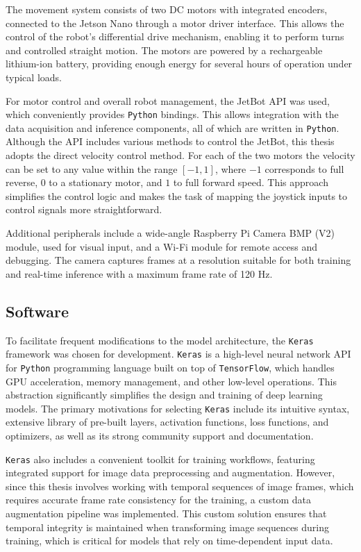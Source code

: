 The movement system consists of two DC motors with integrated encoders, connected to the Jetson Nano through a motor driver interface. This allows the control of the robot’s differential drive mechanism, enabling it to perform turns and controlled straight motion. The motors are powered by a rechargeable lithium-ion battery, providing enough energy for several hours of operation under typical loads.

For motor control and overall robot management, the JetBot API was used, which conveniently provides \texttt{Python} bindings. This allows integration with the data acquisition and inference components, all of which are written in \texttt{Python}. Although the API includes various methods to control the JetBot, this thesis adopts the direct velocity control method. For each of the two motors the velocity can be set to any value within the range \([-1, 1]\), where \(-1\) corresponds to full reverse, \(0\) to a stationary motor, and \(1\) to full forward speed. This approach simplifies the control logic and makes the task of mapping the joystick inputs to control signals more straightforward.

Additional peripherals include a wide-angle Raspberry Pi Camera BMP (V2) module, used for visual input, and a Wi-Fi module for remote access and debugging. The camera captures frames at a resolution suitable for both training and real-time inference with a maximum frame rate of 120 Hz.

\subsection{Software}

To facilitate frequent modifications to the model architecture, the \texttt{Keras} framework was chosen for development. \texttt{Keras} is a high-level neural network API for \texttt{Python} programming language built on top of \texttt{TensorFlow}, which handles GPU acceleration, memory management, and other low-level operations. This abstraction significantly simplifies the design and training of deep learning models. The primary motivations for selecting \texttt{Keras} include its intuitive syntax, extensive library of pre-built layers, activation functions, loss functions, and optimizers, as well as its strong community support and documentation.

\texttt{Keras} also includes a convenient toolkit for training workflows, featuring integrated support for image data preprocessing and augmentation. However, since this thesis involves working with temporal sequences of image frames, which requires accurate frame rate consistency for the training, a custom data augmentation pipeline was implemented. This custom solution ensures that temporal integrity is maintained when transforming image sequences during training, which is critical for models that rely on time-dependent input data.

